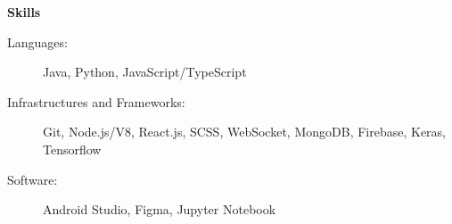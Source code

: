\documentclass[letterpaper,10pt]{article}
\newcommand{\resitem}[1]{\item #1 \vspace{-2pt}}
\newcommand{\resheading}[1]{{\large \colorbox{mygrey}{\begin{minipage}{\textwidth}{\textbf{#1 \vphantom{p\^{E}}}}\end{minipage}}}}
\begin{document}
\begin{itemize}
	
\end{itemize}

\resheading{Skills}

\begin{description}
\item[Languages:] Java, Python, JavaScript/TypeScript
\item[Infrastructures and Frameworks:] Git, Node.js/V8, React.js, SCSS, WebSocket, MongoDB, Firebase, Keras, Tensorflow
\item[Software:] Android Studio, Figma, Jupyter Notebook
\end{description}
\end{document}

